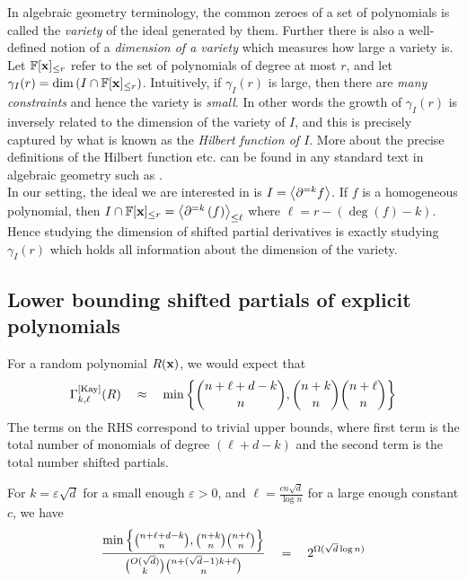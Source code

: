\documentclass{birkjour}
\newcommand{\CM}[1]{\Gamma^{\mathrm{[#1]}}}
\newcommand{\spaced}[1]{\quad#1\quad}
\newcommand{\SPD}[3]{\inangle{\partial^{=#1}\inparen{#3}}_{\leq #2}}
\renewcommand{\epsilon}{\varepsilon}
\providecommand{\DIFaddtex}[1]{{\protect\color{blue}\uwave{#1}}} %
\providecommand{\DIFaddbegin}{} %
\providecommand{\DIFaddend}{} %
\providecommand{\DIFadd}[1]{\texorpdfstring{\DIFaddtex{#1}}{#1}} %
\begin{document}
In algebraic geometry terminology, the common zeroes of a set of polynomials is called the \emph{variety} of the ideal generated by them. Further there is also a well-defined notion of a \emph{dimension of a variety} which measures how large a variety is. Let $\mathbb{F}[\mathbf{x}]_{\leq r}$ refer to the set of polynomials of degree at most $r$, and let $\gamma_I(r) = \dim \left(I \cap \mathbb{F}[\mathbf{x}]_{\leq r}\right)$. Intuitively, if $\gamma_I(r)$ is large, then there are \emph{many constraints} and hence the variety is \emph{small}. In other words the growth of $\gamma_I(r)$ is inversely related to the dimension of the variety of $I$, and this is precisely captured by what is known as the \emph{\DIFaddbegin \DIFadd{Affine }\DIFaddend Hilbert function of $I$}. More about the precise definitions of the \DIFaddbegin \DIFadd{Affine }\DIFaddend Hilbert function etc. can be found in any standard text in algebraic geometry such as \cite{clo}. \\

In our setting, the ideal we are interested in is $I = \left\langle\partial^{=k}f\right\rangle$. If $f$ is a homogeneous polynomial, then $I \intersection \F[\vecx]_{\leq r} = \SPD{k}{\ell}{f}$ where $\ell = r - (\deg(f) - k)$. Hence studying the dimension of shifted partial derivatives is exactly studying $\gamma_I(r)$ which holds all information about the dimension of the variety. 

\subsection{Lower bounding shifted partials of explicit polynomials}

For a random polynomial $R(\mathbf{x})$, we would expect that
$$
\CM{Kay}_{k,\ell}(R) \spaced{\approx} \min\inbrace{\binom{n + \ell + d -k}{n}, \binom{n+k}{n} \binom{n+\ell}{n}}
$$
The terms on the RHS correspond to trivial upper bounds, where first term is the total number of monomials of degree $(\ell + d-k)$ and the second term is the total number shifted partials.  

\begin{claim}\label{clm:spd-ratio}
For $k = \epsilon \sqrt{d}$ for a small enough $\epsilon > 0$, and $\ell = \frac{c n\sqrt{d}}{\log n}$ for a large enough constant $c$, we have
$$
\frac{\min\inbrace{\binom{n + \ell + d -k}{n}, \binom{n+k}{n} \binom{n+\ell}{n}}}{\binom{O(\sqrt{d})}{k}\binom{n + (\sqrt{d}-1)k + \ell}{n}} \spaced{=} 2^{\Omega(\sqrt{d}\log n)}
$$
\end{claim}
\end{document}
